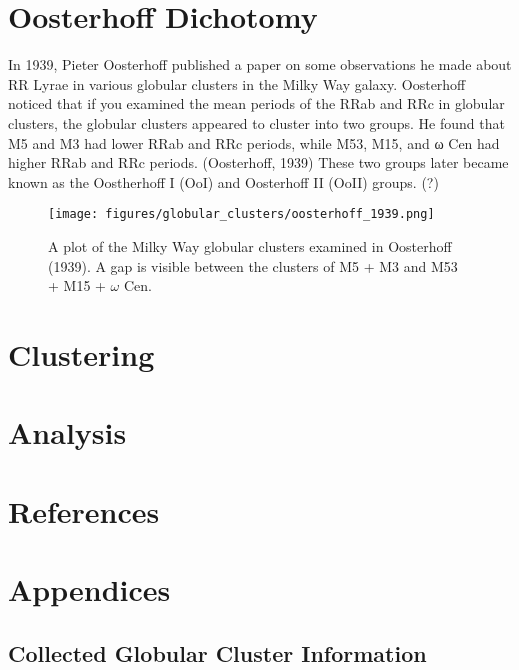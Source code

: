 \documentclass[]{article}
\begin{document}
\newpage

\section{Oosterhoff Dichotomy}

In 1939, Pieter Oosterhoff published a paper on some observations he made about RR Lyrae in various globular clusters in the Milky Way galaxy. Oosterhoff noticed that if you examined the mean periods of the RRab and RRc in globular clusters, the globular clusters appeared to cluster into two groups. He found that M5 and M3 had lower RRab and RRc periods, while M53, M15, and ω Cen had higher RRab and RRc periods. (Oosterhoff, 1939) These two groups later became known as the Oostherhoff I (OoI) and Oosterhoff II (OoII) groups. (?)

\begin{figure}
	\centering
	\texttt{[image: figures/globular\_clusters/oosterhoff\_1939.png]}
	\caption{A plot of the Milky Way globular clusters examined in Oosterhoff (1939). A gap is visible between the clusters of M5 + M3 and M53 + M15 + $\omega$ Cen.}
	\label{fig:oosterhoff_1939_globular_clusters}
\end{figure}

\newpage

\section{Clustering}

\newpage

\section{Analysis}

\newpage

\singlespacing

\section{References}




\newpage

\section{Appendices}

\subsection{Collected Globular Cluster Information}
\end{document}
